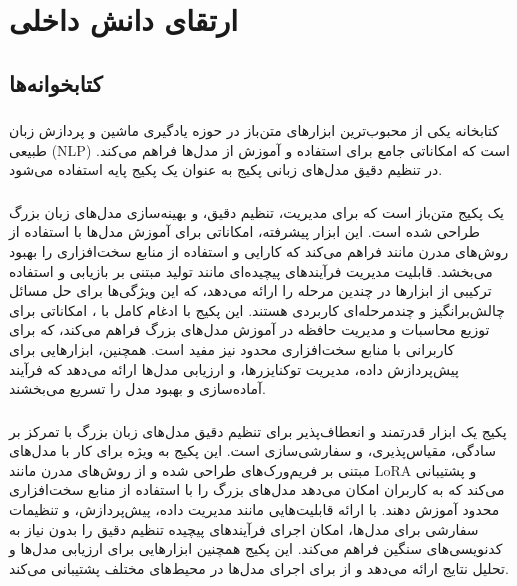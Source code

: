 \documentclass[11pt, a4paper, oneside]{book}
\begin{document}
		
	\chapter{ارتقای دانش داخلی}
	
		\section{کتابخوانه‌ها}
		
			\subsection{}
				
				کتابخانه  یکی از محبوب‌ترین ابزارهای متن‌باز در حوزه یادگیری ماشین و پردازش زبان طبیعی (NLP) است که امکاناتی جامع برای استفاده و آموزش از مدل‌ها فراهم می‌کند.
				در تنظیم دقیق مدل‌های زبانی پکیج  به عنوان یک پکیج پایه استفاده می‌شود.
			
			\subsection{}
				
				یک پکیج متن‌باز است که برای مدیریت، تنظیم دقیق، و بهینه‌سازی مدل‌های زبان بزرگ طراحی شده است. این ابزار پیشرفته، امکاناتی برای آموزش مدل‌ها با استفاده از روش‌های مدرن مانند  فراهم می‌کند که کارایی و استفاده از منابع سخت‌افزاری را بهبود می‌بخشد.  قابلیت مدیریت فرآیندهای پیچیده‌ای مانند تولید مبتنی بر بازیابی و استفاده ترکیبی از ابزارها در چندین مرحله را ارائه می‌دهد، که این ویژگی‌ها برای حل مسائل چالش‌برانگیز و چندمرحله‌ای کاربردی هستند. این پکیج با ادغام کامل با ، امکاناتی برای توزیع محاسبات و مدیریت حافظه در آموزش مدل‌های بزرگ فراهم می‌کند، که برای کاربرانی با منابع سخت‌افزاری محدود نیز مفید است. همچنین، ابزارهایی برای پیش‌پردازش داده، مدیریت توکنایزرها، و ارزیابی مدل‌ها ارائه می‌دهد که فرآیند آماده‌سازی و بهبود مدل را تسریع می‌بخشند. \cite{zheng2024llamafactory}
			
			\subsection{}
			
				پکیج  یک ابزار قدرتمند و انعطاف‌پذیر برای تنظیم دقیق مدل‌های زبان بزرگ با تمرکز بر سادگی، مقیاس‌پذیری، و سفارشی‌سازی است. این پکیج به ویژه برای کار با مدل‌های مبتنی بر فریم‌ورک‌های  طراحی شده و از روش‌های مدرن مانند LoRA و  پشتیبانی می‌کند که به کاربران امکان می‌دهد مدل‌های بزرگ را با استفاده از منابع سخت‌افزاری محدود آموزش دهند.  با ارائه قابلیت‌هایی مانند مدیریت داده، پیش‌پردازش، و تنظیمات سفارشی برای مدل‌ها، امکان اجرای فرآیندهای پیچیده تنظیم دقیق را بدون نیاز به کدنویسی‌های سنگین فراهم می‌کند. این پکیج همچنین ابزارهایی برای ارزیابی مدل‌ها و تحلیل نتایج ارائه می‌دهد و از  برای اجرای مدل‌ها در محیط‌های مختلف پشتیبانی می‌کند.
			
\end{document}
